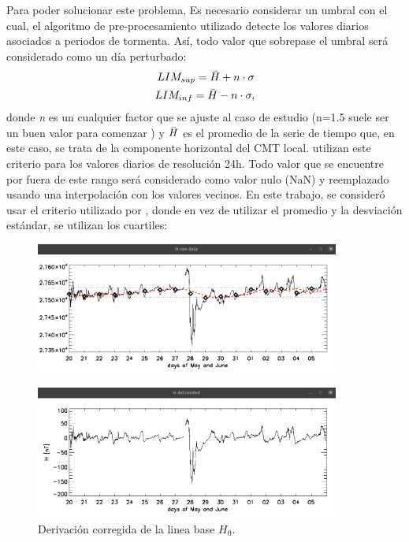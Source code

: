 Para poder solucionar este problema, Es necesario considerar un umbral con el cual, el algoritmo de pre-procesamiento utilizado detecte los valores diarios asociados a periodos de tormenta. Así, todo valor que sobrepase el umbral será considerado como un día perturbado:
\begin{equation}
    \begin{split}
        LIM_{sup} = \Bar{H} + n \cdot \sigma \\
        LIM_{inf} = \Bar{H} - n \cdot \sigma,
    \end{split}    
\end{equation}
donde \emph{n} es un cualquier factor que se ajuste al caso de estudio (n=1.5 suele ser un buen valor para comenzar \cite{Dealing_with_outliers}) y $\Bar{H}$ es el promedio de la serie de tiempo que, en este caso, se trata de la componente horizontal del CMT local. \cite{baseline_Gjerloev, vanKampt} utilizan este criterio para los valores diarios de resolución 24h. Todo valor que se encuentre por fuera de este rango será considerado como valor nulo (NaN) y reemplazado usando una interpolación con los valores vecinos. En este trabajo, se consideró usar el criterio utilizado por \cite{phdthesis_ramon}, donde en vez de utilizar el promedio y la desviación estándar, se utilizan los cuartiles:

\begin{figure}[h!]
    \centering
    \centerline{\Large \bf   
         \hfill}
          \centerline{\Large \bf   
         \hfill}
     \includegraphics[width=10.0cm]{Images/cap2/lineabase/diadia/paso3.1.png}
     \centerline{\Large \bf   
         \hfill}
     \includegraphics[width=10.0cm]{Images/cap2/lineabase/diadia/paso3.2.png}            
       \caption{Derivación corregida de la linea base $H_0$.}
    \label{fig:diadia3}
\end{figure}


